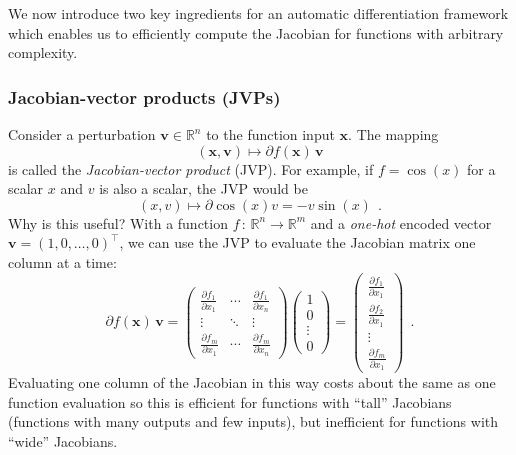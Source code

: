 \documentclass[12pt,dvipsnames]{report}
\renewcommand{\vec}[1]{\boldsymbol{\mathbf{#1}}}
\newcommand{\hquad}{~~}
\begin{document}
We now introduce two key ingredients for an automatic differentiation framework 
which enables us to efficiently compute the Jacobian for functions with arbitrary 
complexity.

\subsubsection{Jacobian-vector products (JVPs)}
Consider a perturbation $\vec v\in\mathbb{R}^n$ to the function input 
$\vec x$. The  mapping 
\begin{equation}
(\vec{x}, \vec{v}) \mapsto \partial f(\vec{x})\,\vec v
\label{eq:jvp}
\end{equation}
is called the \emph{Jacobian-vector product} (JVP). For example, if $f=\cos(x)$ 
for a scalar $x$ and $v$ is also a scalar, the JVP would be 
\begin{equation}
(x, v) \mapsto \partial \cos (x) v=-v \sin (x)
\hquad.
\end{equation}
Why is this useful? With a function $f\,:\,\mathbb{R}^n\rightarrow\mathbb{R}^m$
and a \emph{one-hot} encoded vector $\vec v=(1, 0, \ldots, 0)^\intercal$, we can use the JVP to 
evaluate the Jacobian matrix one column at a time:
\begin{equation}
    \partial f(\vec x)\,\vec v = 
    \begin{pmatrix}
\frac{\partial f_{1}}{\partial x_{1}} & \cdots & \frac{\partial f_{1}}{\partial x_{n}} \\
\vdots & \ddots & \vdots \\
\frac{\partial f_{m}}{\partial x_{1}} & \cdots & \frac{\partial f_{m}}{\partial x_{n}}
    \end{pmatrix}
    \begin{pmatrix}
        1\\
        0\\
        \vdots\\
        0
    \end{pmatrix}
    = \begin{pmatrix}
        \frac{\partial f_{1}}{\partial x_{1}}\\
        \frac{\partial f_{2}}{\partial x_{1}}\\
        \vdots\\
        \frac{\partial f_{m}}{\partial x_{1}}
    \end{pmatrix}
    \hquad.
\end{equation}
Evaluating one column of the Jacobian in this way costs about the same as one function evaluation
so this is efficient for functions with ``tall'' Jacobians (functions with many outputs and few
inputs), but inefficient for functions with ``wide'' Jacobians.
\end{document}
